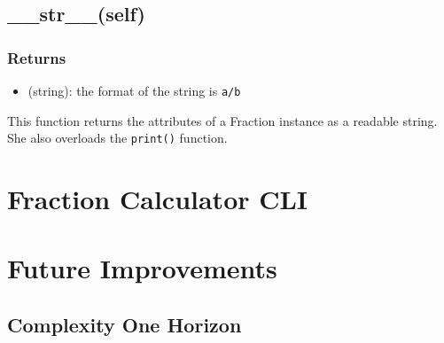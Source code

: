 \documentclass[refman]{scrartcl}
\begin{document}
\subsection{\_\_str\_\_(self)}

\subsubsection*{Returns}

\begin{itemize}
	\item (string): the format of the string is \texttt{a/b}
\end{itemize}

This function returns the attributes of a Fraction instance as a readable string. She also overloads the \texttt{print()} function.

\section{Fraction Calculator CLI}

\section{Future Improvements}

\subsection{Complexity One Horizon}

\subsection{}
\end{document}
